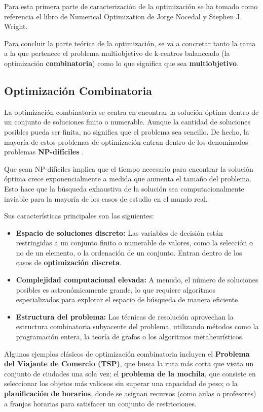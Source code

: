 \documentclass[12pt,a4paper]{book}
\begin{document}
Para esta primera parte de caracterización de la optimización se ha tomado como referencia el libro \cite{Numerical_optimization_nocedal_wright} de Numerical Optimization de Jorge Nocedal y Stephen J. Wright.

Para concluir la parte teórica de la optimización, se va a concretar tanto la rama a la que pertenece el problema multiobjetivo de k-centros balanceado (la optimización \textbf{combinatoria}) como lo que significa que sea \textbf{multiobjetivo}.

\subsection{Optimización Combinatoria}
La optimización combinatoria se centra en encontrar la solución óptima dentro de un conjunto de soluciones finito o numerable. Aunque la cantidad de soluciones posibles pueda ser finita, no significa que el problema sea sencillo.
De hecho, la mayoría de estos problemas de optimización entran dentro de los denominados problemas \textbf{NP-difíciles} \cite{np_hard}.

Que sean NP-difíciles implica que el tiempo necesario para encontrar la solución óptima crece exponencialmente a medida que aumenta el tamaño del problema. Esto hace que la búsqueda exhaustiva de la solución sea computacionalmente inviable para la mayoría de los casos de estudio en el mundo real.

Sus características principales son las siguientes:
\begin{itemize}
    \item \textbf{Espacio de soluciones discreto:} Las variables de decisión están restringidas a un conjunto finito o numerable de valores, como la selección o no de un elemento, o la ordenación de un conjunto. Entran dentro de los casos de \textbf{optimización discreta}. 
    \item \textbf{Complejidad computacional elevada:} A menudo, el número de soluciones posibles es astronómicamente grande, lo que requiere algoritmos especializados para explorar el espacio de búsqueda de manera eficiente.
    \item \textbf{Estructura del problema:} Las técnicas de resolución aprovechan la estructura combinatoria subyacente del problema, utilizando métodos como la programación entera, la teoría de grafos o los algoritmos metaheurísticos.
\end{itemize}

Algunos ejemplos clásicos de optimización combinatoria incluyen el \textbf{Problema del Viajante de Comercio (TSP)}, 
que busca la ruta más corta que visita un conjunto de ciudades una sola vez;
el \textbf{problema de la mochila}, que consiste en seleccionar los objetos más valiosos sin superar una capacidad de peso;
o la \textbf{planificación de horarios}, donde se asignan recursos (como aulas o profesores) a franjas horarias para satisfacer un conjunto de restricciones.
\end{document}
